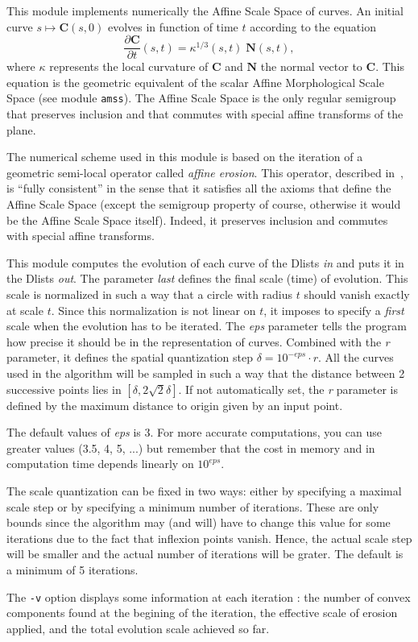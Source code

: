 This module implements numerically the Affine Scale Space of curves.
An initial curve $s\mapsto {\mathbf C}(s,0)$ evolves in function 
of time $t$ according to the 
equation
$$\frac{\partial {\mathbf C}}{\partial t}(s,t) 
= \kappa^{1/3}(s,t) \; {\mathbf N}(s,t),$$
where $\kappa$ represents the local curvature of ${\mathbf C}$ and
${\mathbf N}$ the normal vector to ${\mathbf C}$. This equation is
the geometric equivalent of the scalar Affine Morphological Scale
Space (see module \verb+amss+).
The Affine Scale Space is the only regular semigroup that preserves 
inclusion and that commutes with special affine transforms of the plane.

\medskip

The numerical scheme used in this module is based on the iteration
of a geometric semi-local operator called {\em affine erosion}.
This operator, described in~\cite{moisan:affine}, is ``fully consistent'' in the
sense that it satisfies all the axioms that define the Affine Scale
Space (except the semigroup property of course, otherwise it would be
the Affine Scale Space itself). Indeed, it preserves inclusion
and commutes with special affine transforms.

\medskip

This module computes the evolution of each curve of the Dlists {\em in}
and puts it in the Dlists {\em out}.
The parameter {\em last} defines the final scale (time) of evolution.
This scale is normalized in such a way that a circle with radius $t$
should vanish exactly at scale $t$. Since this normalization is not 
linear on $t$, it imposes to specify a {\em first} scale when the 
evolution has to be iterated. The {\em eps} parameter tells the program
how precise it should be in the representation of curves. Combined
with the {\em r} parameter, it defines the spatial quantization step
$\delta = 10^{-eps} \cdot r$. 
All the curves used in the algorithm will
be sampled in such a way that the distance between 2 successive points
lies in $[\delta,2\sqrt 2\delta]$. If not automatically set, the {\em r}
parameter is defined by the maximum distance to origin given by an
input point.

The default values of {\em eps} is 3. For more accurate computations,
you can use greater values (3.5, 4, 5, ...) but remember that
the cost in memory and in computation time depends linearly on $10^{eps}$.

\medskip

The scale quantization can be fixed in two ways: either by specifying
a maximal scale step or by specifying a minimum number of iterations.
These are only bounds since the algorithm may (and will) have to change
this value for some iterations due to the fact that inflexion points
vanish. Hence, the actual scale step will be smaller and the actual
number of iterations will be grater. The default is a minimum of 5 iterations.

\medskip

The \verb+-v+ option displays some information at each iteration :
the number of convex components found at the begining of the iteration,
the effective scale of erosion applied, and the total evolution scale
achieved so far.

